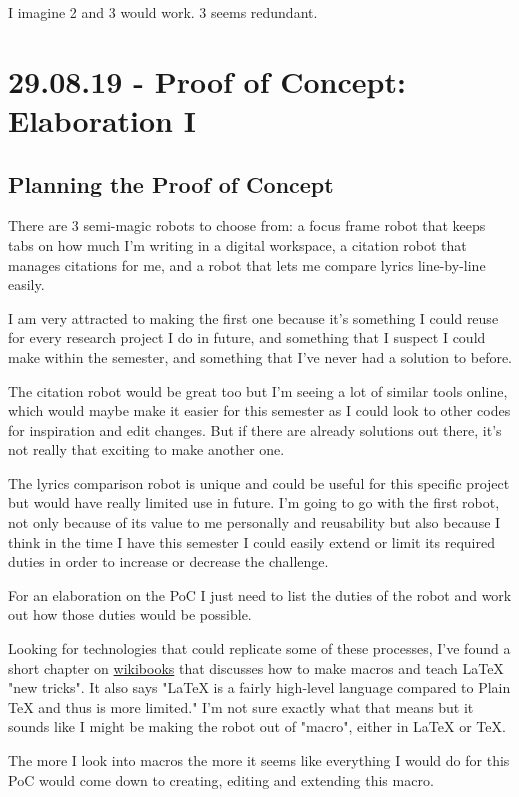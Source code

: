 \documentclass[12pt]{article}
\begin{document}
I imagine 2 and 3 would work. 3 seems redundant.

\section{29.08.19 - Proof of Concept: Elaboration I}

\subsection{Planning the Proof of Concept}

There are 3 semi-magic robots to choose from: a focus frame robot that keeps tabs on how much I'm writing in a digital workspace, a citation robot that manages citations for me, and a robot that lets me compare lyrics line-by-line easily. 

I am very attracted to making the first one because it's something I could reuse for every research project I do in future, and something that I suspect I could make within the semester, and something that I've never had a solution to before.

The citation robot would be great too but I'm seeing a lot of similar tools online, which would maybe make it easier for this semester as I could look to other codes for inspiration and edit changes. But if there are already solutions out there, it's not really that exciting to make another one.

The lyrics comparison robot is unique and could be useful for this specific project but would have really limited use in future. 
I'm going to go with the first robot, not only because of its value to me personally and reusability but also because I think in the time I have this semester I could easily extend or limit its required duties in order to increase or decrease the challenge.

For an elaboration on the PoC I just need to list the duties of the robot and work out how those duties would be possible.

Looking for technologies that could replicate some of these processes, I've found a short chapter on \href{https://en.wikibooks.org/wiki/LaTeX/Macros}{wikibooks} that discusses how to make macros and teach LaTeX "new tricks". It also says "LaTeX is a fairly high-level language compared to Plain TeX and thus is more limited." I'm not sure exactly what that means but it sounds like I might be making the robot out of "macro", either in LaTeX or TeX.

The more I look into macros the more it seems like everything I would do for this PoC would come down to creating, editing and extending this macro. 
\end{document}
